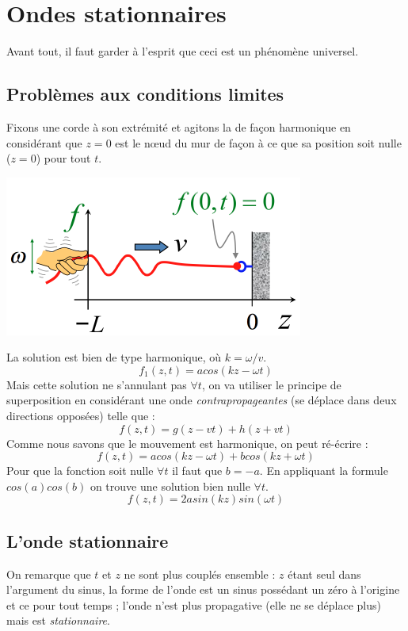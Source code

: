 \documentclass	[11pt, a4paper, openany]{book}
\begin{document}
\section{Ondes stationnaires}
Avant tout, il faut garder à l'esprit que ceci est un phénomène universel.

\subsection{Problèmes aux conditions limites}
Fixons une corde à son extrémité et agitons la de façon harmonique en considérant que $z = 0$ est le nœud du mur de façon à ce que sa position soit nulle ($z = 0$) pour tout $t$.
\begin{center}
\includegraphics[scale=0.4]{oo/image37.png}
\end{center}
La solution est bien de type harmonique, où $k = \omega / v$.
\begin{equation}
f_1(z, t) = a cos(kz - \omega t)
\end{equation}
Mais cette solution ne s'annulant pas $\forall t$, on va utiliser le principe de superposition en considérant une onde \textit{contrapropageantes} (se déplace dans deux directions opposées) telle que :
\begin{equation}
f(z, t) = g(z - vt) + h(z +vt)
\end{equation}
Comme nous savons que le mouvement est harmonique, on peut ré-écrire : 
\begin{equation}
f(z,t) = a cos(kz - \omega t) + b cos(kz + \omega t)
\end{equation}
Pour que la fonction soit nulle $\forall t$ il faut que $b = -a$. En appliquant la formule $cos(a)cos(b)$ on trouve une solution bien nulle $\forall t$. 
\begin{equation}
f(z, t) = 2a sin(kz)sin(\omega t)
\end{equation}

\subsection{L'onde stationnaire}
On remarque que $t$ et $z$ ne sont plus couplés ensemble : $z$ étant seul dans l'argument du sinus, la forme de l'onde est un sinus possédant un zéro à l'origine et ce pour tout temps ; l'onde n'est plus propagative (elle ne se déplace plus) mais est \textit{stationnaire}.\\
\end{document}
